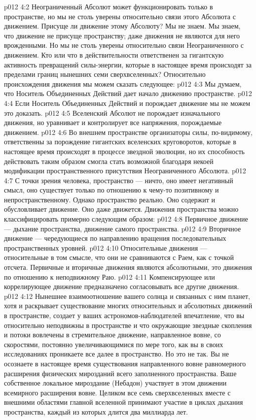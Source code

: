 \vs p012 4:2 Неограниченный Абсолют может функционировать только в пространстве, но мы не столь уверены относительно связи этого Абсолюта с движением. Присуще ли движение этому Абсолюту? Мы не знаем. Мы знаем, что движение не присуще пространству; даже движения  не являются для него врожденными. Но мы не столь уверены относительно связи Неограниченного с движением. Кто или что в действительности ответственен за гигантскую активность превращений силы\hyp{}энергии, которые в настоящее время происходят за пределами границ нынешних семи сверхвселенных? Относительно происхождения движения мы можем сказать следующее:
\vs p012 4:3 \bibnobreakspace Мы думаем, что Носитель Объединенных Действий дает начало движению  пространстве.
\vs p012 4:4 \bibnobreakspace Если Носитель Объединенных Действий и порождает движение  мы не можем это доказать.
\vs p012 4:5 \bibnobreakspace Вселенский Абсолют не порождает изначального движения, но уравнивает и контролирует все напряжения, порождаемые движением.
\vs p012 4:6 \pc Во внешнем пространстве организаторы силы, по\hyp{}видимому, ответственны за порождение гигантских вселенских круговоротов, которые в настоящее время происходят в процессе звездной эволюции, но их способность действовать таким образом смогла стать возможной благодаря некоей модификации пространственного присутствия Неограниченного Абсолюта.
\vs p012 4:7 \pc С точки зрения человека, пространство --- ничто, оно имеет негативный смысл, оно существует только по отношению к чему\hyp{}то позитивному и непространственному. Однако пространство реально. Оно содержит и обусловливает движение. Оно даже движется. Движения пространства можно классифицировать примерно следующим образом:
\vs p012 4:8 \bibnobreakspace Первичное движение --- дыхание пространства, движение самого пространства.
\vs p012 4:9 \bibnobreakspace Вторичное движение --- чередующиеся по направлению вращения последовательных пространственных уровней.
\vs p012 4:10 \bibnobreakspace Относительные движения --- относительные в том смысле, что они не сравниваются с Раем, как с точкой отсчета. Первичные и вторичные движения являются абсолютными, это движения по отношению к неподвижному Раю.
\vs p012 4:11 \bibnobreakspace Компенсирующее или коррелирующее движение предназначено согласовывать все другие движения.
\vs p012 4:12 \pc Нынешнее взаимоотношение вашего солнца и связанных с ним планет, хотя и раскрывает существование многих относительных и абсолютных движений в пространстве, создает у ваших астрономов\hyp{}наблюдателей впечатление, что вы относительно неподвижны в пространстве и что окружающие звездные скопления и потоки вовлечены в стремительное движение, направленное вовне, со скоростями, постоянно увеличивающимися по мере того, как вы в своих исследованиях проникаете все далее в пространство. Но это не так. Вы не осознаете в настоящее время существования направленного вовне равномерного расширения физических мирозданий всего заполненного пространства. Ваше собственное локальное мироздание (Небадон) участвует в этом движении всемирного расширения вовне. Целиком все семь сверхвселенных вместе с внешними областями главной вселенной принимают участие в циклах дыхания пространства, каждый из которых длится два миллиарда лет.
